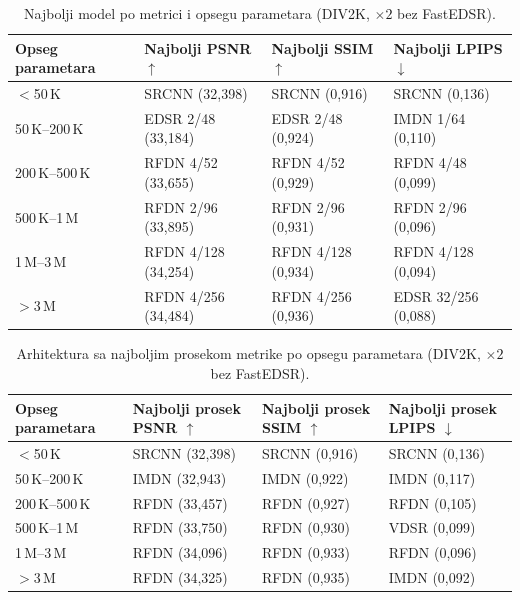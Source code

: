 
\begin{table}[H]
    \centering
    \caption{Najbolji model po metrici i opsegu parametara (DIV2K, $\times2$ bez FastEDSR).}
    \label{tab:param_bins_best_model_2x_DIV2K}
    \small
    \setlength{\tabcolsep}{4pt}
    \begin{tabular}{@{}llll@{}}
        \toprule
        Opseg parametara & Najbolji PSNR $\uparrow$ & Najbolji SSIM $\uparrow$ & Najbolji LPIPS $\downarrow$ \\
        \midrule
        $<$50\,K & SRCNN (32,398) & SRCNN (0,916) & SRCNN (0,136) \\
        50\,K--200\,K & EDSR 2/48 (33,184) & EDSR 2/48 (0,924) & IMDN 1/64 (0,110) \\
        200\,K--500\,K & RFDN 4/52 (33,655) & RFDN 4/52 (0,929) & RFDN 4/48 (0,099) \\
        500\,K--1\,M & RFDN 2/96 (33,895) & RFDN 2/96 (0,931) & RFDN 2/96 (0,096) \\
        1\,M--3\,M & RFDN 4/128 (34,254) & RFDN 4/128 (0,934) & RFDN 4/128 (0,094) \\
        $>$3\,M & RFDN 4/256 (34,484) & RFDN 4/256 (0,936) & EDSR 32/256 (0,088) \\
        \bottomrule
    \end{tabular}
\end{table}

\begin{table}[H]
    \centering
    \caption{Arhitektura sa najboljim prosekom metrike po opsegu parametara (DIV2K, $\times2$ bez FastEDSR).}
    \label{tab:param_bins_best_arch_2x_DIV2K}
    \small
    \setlength{\tabcolsep}{4pt}
    \begin{tabular}{@{}llll@{}}
        \toprule
        Opseg parametara & Najbolji prosek PSNR $\uparrow$ & Najbolji prosek SSIM $\uparrow$ & Najbolji prosek LPIPS $\downarrow$ \\
        \midrule
        $<$50\,K & SRCNN (32,398) & SRCNN (0,916) & SRCNN (0,136) \\
        50\,K--200\,K & IMDN (32,943) & IMDN (0,922) & IMDN (0,117) \\
        200\,K--500\,K & RFDN (33,457) & RFDN (0,927) & RFDN (0,105) \\
        500\,K--1\,M & RFDN (33,750) & RFDN (0,930) & VDSR (0,099) \\
        1\,M--3\,M & RFDN (34,096) & RFDN (0,933) & RFDN (0,096) \\
        $>$3\,M & RFDN (34,325) & RFDN (0,935) & IMDN (0,092) \\
        \bottomrule
    \end{tabular}
\end{table}
